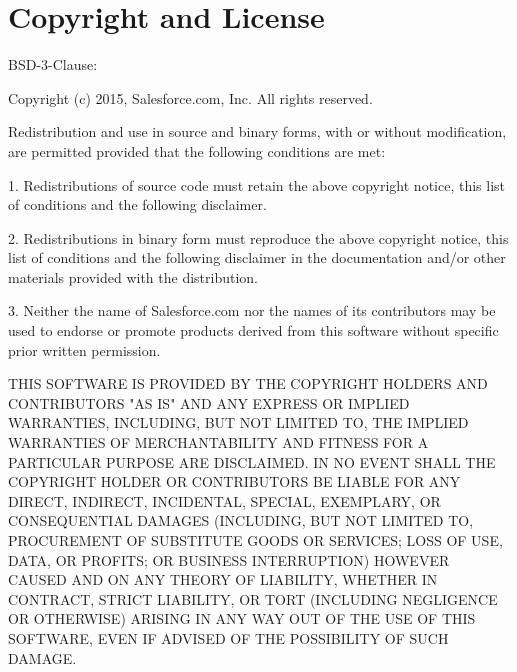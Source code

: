 \section*{Copyright and License}

B\+S\+D-\/3-\/\+Clause\+:


\begin{DoxyCode}
Copyright (c) 2015, Salesforce.com, Inc.
All rights reserved.

Redistribution and use in source and binary forms, with or without
modification, are permitted provided that the following conditions are met:

1. Redistributions of source code must retain the above copyright notice,
this list of conditions and the following disclaimer.

2. Redistributions in binary form must reproduce the above copyright notice,
this list of conditions and the following disclaimer in the documentation
and/or other materials provided with the distribution.

3. Neither the name of Salesforce.com nor the names of its contributors may
be used to endorse or promote products derived from this software without
specific prior written permission.

THIS SOFTWARE IS PROVIDED BY THE COPYRIGHT HOLDERS AND CONTRIBUTORS "AS IS"
AND ANY EXPRESS OR IMPLIED WARRANTIES, INCLUDING, BUT NOT LIMITED TO, THE
IMPLIED WARRANTIES OF MERCHANTABILITY AND FITNESS FOR A PARTICULAR PURPOSE
ARE DISCLAIMED. IN NO EVENT SHALL THE COPYRIGHT HOLDER OR CONTRIBUTORS BE
LIABLE FOR ANY DIRECT, INDIRECT, INCIDENTAL, SPECIAL, EXEMPLARY, OR
CONSEQUENTIAL DAMAGES (INCLUDING, BUT NOT LIMITED TO, PROCUREMENT OF
SUBSTITUTE GOODS OR SERVICES; LOSS OF USE, DATA, OR PROFITS; OR BUSINESS
INTERRUPTION) HOWEVER CAUSED AND ON ANY THEORY OF LIABILITY, WHETHER IN
CONTRACT, STRICT LIABILITY, OR TORT (INCLUDING NEGLIGENCE OR OTHERWISE)
ARISING IN ANY WAY OUT OF THE USE OF THIS SOFTWARE, EVEN IF ADVISED OF THE
POSSIBILITY OF SUCH DAMAGE.
\end{DoxyCode}
 